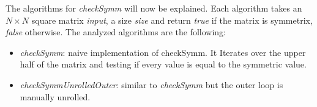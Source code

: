 \documentclass[conference]{IEEEtran}
\begin{document}
The algorithms for \textit{checkSymm} will now be explained. Each algorithm takes an $N \times N$ square matrix \textit{input}, a size \textit{size} and return \textit{true} if the matrix is symmetrix, \textit{false} otherwise.
The analyzed algorithms are the following:
\begin{itemize}
\item \textit{checkSymm}: naive implementation of checkSymm. It Iterates over the upper half of the matrix and testing if every value is equal to the symmetric value.

  
\item \textit{checkSymmUnrolledOuter}: similar to \textit{checkSymm} but the outer loop is manually unrolled.

  

\end{itemize}
\end{document}
